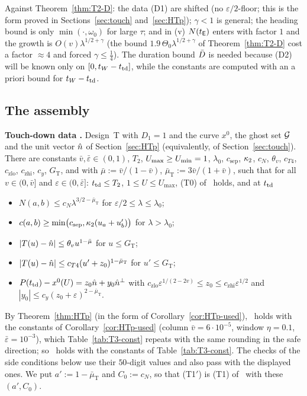\begin{remark}\label{rem:T3-D}
Against Theorem~\ref{thm:T2-D}: the data (D1) are shifted (no $\varepsilon/2$-floor; this is the form proved in
Sections~\ref{sec:touch} and~\ref{sec:HTp}); $\gamma<1$ is general; the heading bound is only $\min(\cdot,\omega_0)$ for large
$\tau$; and in (v) $N(t_{\mathsf E})$ enters with factor $1$ and the growth is $O(v)\lambda^{1/2+\gamma}$ (the bound
$1.9\,\Theta_0\lambda^{1/2+\gamma}$ of Theorem~\ref{thm:T2-D} cost a factor $\approx4$ and forced $\gamma\le\frac14$). The duration
bound $\bar D$ is needed because (D2) will be known only on $[0,t_W-t_{\mathrm{td}}]$, while the constants are computed with an a priori
bound for $t_W-t_{\mathrm{td}}$.
\end{remark}

\subsection{The assembly}

%
\textbf{Touch-down data \TzHT.} Design~T with $D_1=1$ and the curve $x^0$, the ghost set $\mathcal G$ and the unit vector $\hat n$ of
Section~\ref{sec:HTp} (equivalently, of Section~\ref{sec:touch}). There are constants $\bar v,\bar\varepsilon\in(0,1)$, $T_2$, $U_{\max}\ge U_{\min}=1$, $\lambda_0$,
$c_{\mathrm{sep}}$, $\kappa_2$, $c_N$, $\theta_v$, $c_{T4}$, $c_{\mathrm{zlo}}$, $c_{\mathrm{zhi}}$, $c_y$, $G_{\mathrm T}$, and with
$\bar\mu:=\bar v/(1-\bar v)$, $\bar\mu_{\mathrm T}:=3\bar v/(1+\bar v)$, such that for all $v\in(0,\bar v]$ and
$\varepsilon\in(0,\bar\varepsilon]$: $t_{\mathrm{td}}\le T_2$, $1\le U\le U_{\max}$, (T0) of \MHT\ holds, and at $t_{\mathrm{td}}$
\begin{itemize}
\item[(T1$'$)] $N(a,b)\le c_N\lambda^{3/2-\bar\mu_{\mathrm T}}$ for $\varepsilon/2\le\lambda\le\lambda_0$;
\item[(T2$'$)] $c(a,b)\ge\min\bigl(c_{\mathrm{sep}},\kappa_2(u_a+u_b')\bigr)$ for $\lambda>\lambda_0$;
\item[(T3$'$)] $|T(u)-\hat n|\le\theta_vu^{1-\bar\mu}$ for $u\le G_{\mathrm T}$;
\item[(T4$'$)] $|T(u)-\hat n|\le c_{T4}(u'+z_0)^{1-\bar\mu_{\mathrm T}}$ for $u'\le G_{\mathrm T}$;
\item[(T5$'$)] $P(t_{\mathrm{td}})-x^0(U)=z_0\hat n+y_0\hat n^\perp$ with $c_{\mathrm{zlo}}\varepsilon^{1/(2-2v)}\le z_0\le c_{\mathrm{zhi}}\varepsilon^{1/2}$ and
$|y_0|\le c_y(z_0+\varepsilon)^{2-\bar\mu_{\mathrm T}}$.
\end{itemize}
By Theorem~\ref{thm:HTp} (in the form of Corollary~\ref{cor:HTp-used}), \TzHT\ holds with the constants of
Corollary~\ref{cor:HTp-used} (column $\bar v=6\cdot10^{-5}$, window $\eta=0.1$, $\bar\varepsilon=10^{-3}$), which
Table~\ref{tab:T3-const} repeats with the same rounding in the safe direction; so \TzHT\ holds with the constants of
Table~\ref{tab:T3-const}. The checks of the side conditions below use their $50$-digit values and also pass with the displayed
ones. We put
$a':=1-\bar\mu_{\mathrm T}$ and $C_0:=c_N$, so that (T1$'$) is (T1) of \MHT\ with these $(a',C_0)$.

